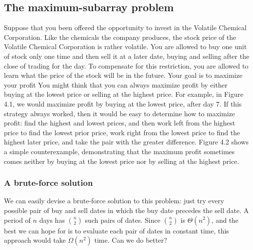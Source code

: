 \documentclass{report}
\begin{document}
        \subsection{The maximum-subarray problem}
        \bigbreak \noindent 
        Suppose that you been offered the opportunity to invest in the Volatile Chemical
        Corporation. Like the chemicals the company produces, the stock price of the
        Volatile Chemical Corporation is rather volatile. You are allowed to buy one unit
        of stock only one time and then sell it at a later date, buying and selling after the
        close of trading for the day. To compensate for this restriction, you are allowed to
        learn what the price of the stock will be in the future. Your goal is to maximize
        your profit
        \bigbreak \noindent 
        You might think that you can always maximize profit by either buying at the
        lowest price or selling at the highest price. For example, in Figure 4.1, we would
        maximize profit by buying at the lowest price, after day 7. If this strategy always
        worked, then it would be easy to determine how to maximize profit: find the highest
        and lowest prices, and then work left from the highest price to find the lowest prior
        price, work right from the lowest price to find the highest later price, and take
        the pair with the greater difference. Figure 4.2 shows a simple counterexample, demonstrating that the maximum profit sometimes comes neither by buying at the lowest price nor by selling at the highest price.
        \bigbreak \noindent 
        \bigbreak \noindent 
        \pagebreak 
        \subsubsection{A brute-force solution}
        \bigbreak \noindent 
        We can easily devise a brute-force solution to this problem: just try every possible pair of buy and sell dates in which the buy date precedes the sell date. A period of \( n \) days has \( \binom{n}{2} \) such pairs of dates. Since \( \binom{n}{2} \) is \( \Theta(n^2) \), and the best we can hope for is to evaluate each pair of dates in constant time, this approach would take \( \Omega(n^2) \) time. Can we do better?
        \bigbreak \noindent 
\end{document}
